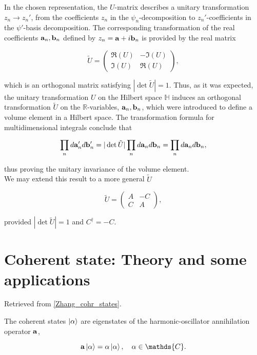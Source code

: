 \documentclass{homework}
\begin{document}
In the chosen representation, the $U$-matrix describes a unitary transformation $z_n \rightarrow z_n'$, from the coefficients $z_n$ in the $\psi_n$-decomposition to $z_n'$-coefficients in the $\psi'$-basis decomposition. The corresponding transformation of the real coefficients ${\bf a}_n, {\bf b}_n$ defined by $z_n = {\bf a} + i {\bf b}_n$ is provided by the real matrix 

$$
    \tilde{U} = \left( \begin{array}{cc}
        \mathfrak{R}(U)  & - \mathfrak{I}(U)  \\
        \mathfrak{I}(U)  &  \mathfrak{R}(U) 
    \end{array}
    \right),
$$

which is an orthogonal matrix satisfying $|\det \tilde U|= 1$. Thus, as it was expected, the unitary transformation $U$ on the Hilbert space $\mathds{H}$ induces an orthogonal transformation $\tilde{U}$ on the $\mathds{R}$-variables, ${\bf a}_n, {\bf b}_n$, which were introduced to define a volume element in a Hilbert space. The transformation formula for multidimensional integrals conclude that 

$$
\prod_{n} d{\bf a}'_n d{\bf b}'_n = |\det \tilde U| \prod_{n} d{\bf a}_n d{\bf b}_n = \prod_{n} d{\bf a}_n d{\bf b}_n,
$$

thus proving the unitary invariance of the volume element. \\

We may extend this result to a more general $\tilde{U}$

$$
    \tilde{U} = \left( \begin{array}{cc}
        A  & - C \\
        C  &  A
    \end{array}
    \right),
$$

provided $|\det \tilde{U}| = 1$ and $C^\dagger = -C$. 
\fi

\clearpage

\section{Coherent state: Theory and some applications}

Retrieved from \ref{Zhang_cohr_states}. \\

\begin{definition}

The coherent states $\ket{\alpha}$ are eigenstates of the harmonic-oscillator annihilation operator ${\bf a}$,

\begin{equation}
    {\bf a} \ket{\alpha} = \alpha \ket{\alpha}, \quad \alpha \in \mathds{C}.
\end{equation}

\end{definition}
\end{document}
